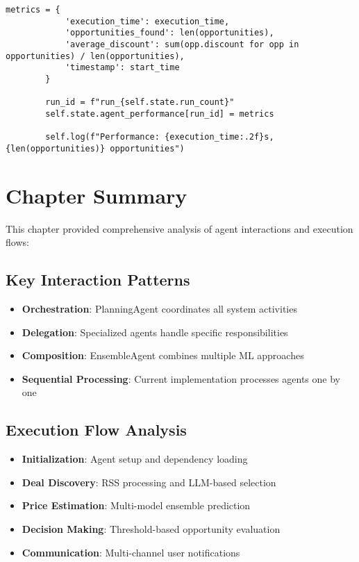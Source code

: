 \begin{lstlisting}[caption=Enhanced State Management System]
        metrics = {
            'execution_time': execution_time,
            'opportunities_found': len(opportunities),
            'average_discount': sum(opp.discount for opp in opportunities) / len(opportunities),
            'timestamp': start_time
        }
        
        run_id = f"run_{self.state.run_count}"
        self.state.agent_performance[run_id] = metrics
        
        self.log(f"Performance: {execution_time:.2f}s, {len(opportunities)} opportunities")
\end{lstlisting}

\section{Chapter Summary}

This chapter provided comprehensive analysis of agent interactions and execution flows:

\subsection{Key Interaction Patterns}
\begin{itemize}
\item \textbf{Orchestration}: PlanningAgent coordinates all system activities
\item \textbf{Delegation}: Specialized agents handle specific responsibilities
\item \textbf{Composition}: EnsembleAgent combines multiple ML approaches
\item \textbf{Sequential Processing}: Current implementation processes agents one by one
\end{itemize}

\subsection{Execution Flow Analysis}
\begin{itemize}
\item \textbf{Initialization}: Agent setup and dependency loading
\item \textbf{Deal Discovery}: RSS processing and LLM-based selection
\item \textbf{Price Estimation}: Multi-model ensemble prediction
\item \textbf{Decision Making}: Threshold-based opportunity evaluation
\item \textbf{Communication}: Multi-channel user notifications
\end{itemize}

